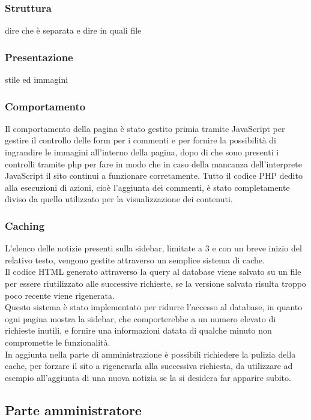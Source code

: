 \documentclass[openany, a4paper, 12pt]{report}
\begin{document}
			\subsubsection{Struttura}
			dire che è separata e dire in quali file
			\subsubsection{Presentazione}
			stile ed immagini
			\subsubsection{Comportamento}
			Il comportamento della pagina è stato gestito primia tramite JavaScript per gestire il controllo delle form per i commenti e per fornire la possibilità di ingrandire le immagini all'interno della pagina, dopo di che sono presenti i controlli tramite php per fare in modo che in caso della mancanza dell'interprete JavaScript il sito continui a funzionare corretamente.
			Tutto il codice PHP dedito alla esecuzioni di azioni, cioè l'aggiunta dei commenti, è stato completamente diviso da quello utilizzato per la visualizzazione dei contenuti.\\
			\subsubsection{Caching}
			L'elenco delle notizie presenti sulla sidebar, limitate a 3 e con un breve inizio del relativo testo, vengono gestite attraverso un semplice sistema di cache.\\
			Il codice HTML generato attraverso la query al database viene salvato su un file per essere riutilizzato alle successive richieste, se la versione salvata risulta troppo poco recente viene rigenerata.\\
			Questo sistema è stato implementato per ridurre l'accesso al database, in quanto ogni pagina mostra la sidebar, che comporterebbe a un numero elevato di richieste inutili, e fornire una informazioni datata di qualche minuto non compromette le funzionalità.\\
			In aggiunta nella parte di amministrazione è possibili richiedere la pulizia della cache, per forzare il sito a rigenerarla alla successiva richiesta, da utilizzare ad esempio all'aggiunta di una nuova notizia se la si desidera far apparire subito.
	
	\subsection{Parte amministratore}
\end{document}
